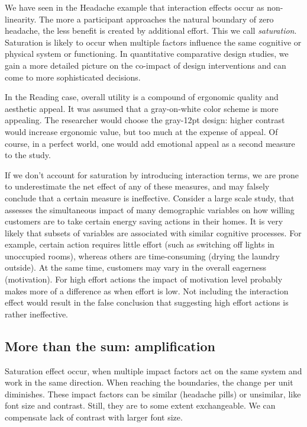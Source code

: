 \documentclass[]{svmono}
\theoremstyle{definition}
\theoremstyle{definition}
\theoremstyle{definition}
\theoremstyle{remark}
\begin{document}
We have seen in the Headache example that interaction effects occur as
non-linearity. The more a participant approaches the natural boundary of
zero headache, the less benefit is created by additional effort. This we
call \emph{saturation}. Saturation is likely to occur when multiple
factors influence the same cognitive or physical system or functioning.
In quantitative comparative design studies, we gain a more detailed
picture on the co-impact of design interventions and can come to more
sophisticated decisions.

In the Reading case, overall utility is a compound of ergonomic quality
and aesthetic appeal. It was assumed that a gray-on-white color scheme
is more appealing. The researcher would choose the gray-12pt design:
higher contrast would increase ergonomic value, but too much at the
expense of appeal. Of course, in a perfect world, one would add
emotional appeal as a second measure to the study.

If we don't account for saturation by introducing interaction terms, we
are prone to underestimate the net effect of any of these measures, and
may falsely conclude that a certain measure is ineffective. Consider a
large scale study, that assesses the simultaneous impact of many
demographic variables on how willing customers are to take certain
energy saving actions in their homes. It is very likely that subsets of
variables are associated with similar cognitive processes. For example,
certain action requires little effort (such as switching off lights in
unoccupied rooms), whereas others are time-consuming (drying the laundry
outside). At the same time, customers may vary in the overall eagerness
(motivation). For high effort actions the impact of motivation level
probably makes more of a difference as when effort is low. Not including
the interaction effect would result in the false conclusion that
suggesting high effort actions is rather ineffective.

\subsection{More than the sum:
amplification}\label{more-than-the-sum-amplification}

Saturation effect occur, when multiple impact factors act on the same
system and work in the same direction. When reaching the boundaries, the
change per unit diminishes. These impact factors can be similar
(headache pills) or unsimilar, like font size and contrast. Still, they
are to some extent exchangeable. We can compensate lack of contrast with
larger font size.
\end{document}
